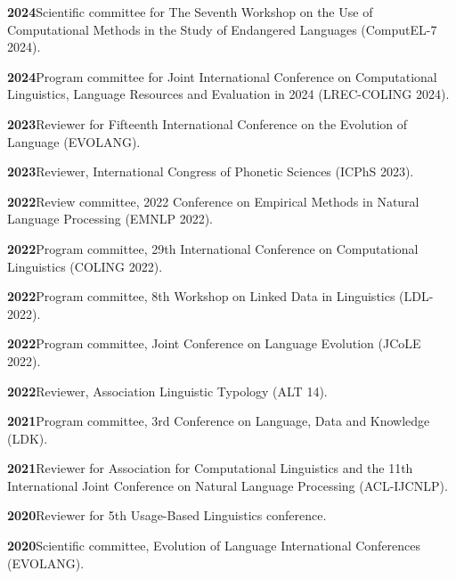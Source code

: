 \documentclass[11pt]{article}
\newcommand{\hangpara}{
 \setlength{\parindent}{0in} %
 \hangindent=0.42in %
}
\begin{document}
\hangpara
\vskip 6pt
{\bf 2024}\hspace{1ex}Scientific committee for The Seventh Workshop on the Use of Computational Methods in the Study of Endangered Languages (ComputEL-7 2024).

\hangpara
\vskip 6pt
{\bf 2024}\hspace{1ex}Program committee for Joint International Conference on Computational Linguistics, Language Resources and Evaluation in 2024 (LREC-COLING 2024).

\hangpara
\vskip 6pt
{\bf 2023}\hspace{1ex}Reviewer for Fifteenth International Conference on the Evolution of Language (EVOLANG).

\hangpara
\vskip 6pt
{\bf 2023}\hspace{1ex}Reviewer, International Congress of Phonetic Sciences (ICPhS 2023).

\hangpara
\vskip 6pt
{\bf 2022}\hspace{1ex}Review committee, 2022 Conference on Empirical Methods in Natural Language Processing (EMNLP 2022).

\hangpara
\vskip 6pt
{\bf 2022}\hspace{1ex}Program committee, 29th International Conference on Computational Linguistics (COLING 2022).

\hangpara
\vskip 6pt
{\bf 2022}\hspace{1ex}Program committee, 8th Workshop on Linked Data in Linguistics (LDL-2022).

\hangpara
\vskip 6pt
{\bf 2022}\hspace{1ex}Program committee, Joint Conference on Language Evolution (JCoLE 2022).

\hangpara
\vskip 6pt
{\bf 2022}\hspace{1ex}Reviewer, Association Linguistic Typology (ALT 14).

\hangpara
\vskip 6pt
{\bf 2021}\hspace{1ex}Program committee, 3rd Conference on Language, Data and Knowledge (LDK).

\hangpara
\vskip 6pt
{\bf 2021}\hspace{1ex}Reviewer for Association for Computational Linguistics and the 11th International Joint Conference on Natural Language Processing (ACL-IJCNLP).

\vskip 6pt
\hangpara
{\bf 2020}\hspace{1ex}Reviewer for 5th Usage-Based Linguistics conference.

\vskip 6pt
\hangpara
{\bf 2020}\hspace{1ex}Scientific committee, Evolution of Language International Conferences (EVOLANG).
\end{document}
